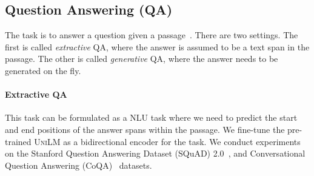 \documentclass{article}
\newcommand\ours{\textsc{UniLM}}
\begin{document}
\subsection{Question Answering (QA)}
\label{sec:qa}

The task is to answer a question given a passage~\cite{squad1, squad2,gao2019neural}. There are two settings. The first is called \emph{extractive} QA, where the answer is assumed to be a text span in the passage. The other is called \emph{generative} QA, where the answer needs to be generated on the fly.



\paragraph{Extractive QA}
\label{sec:ext:qa}

This task can be formulated as a NLU task where we need to predict the start and end positions of the answer spans within the passage.
We fine-tune the pre-trained \ours{} as a bidirectional encoder for the task.
We conduct experiments on the Stanford Question Answering Dataset (SQuAD) 2.0~\citep{squad2}, and Conversational Question Answering (CoQA)~\citep{coqa} datasets.



\end{document}
